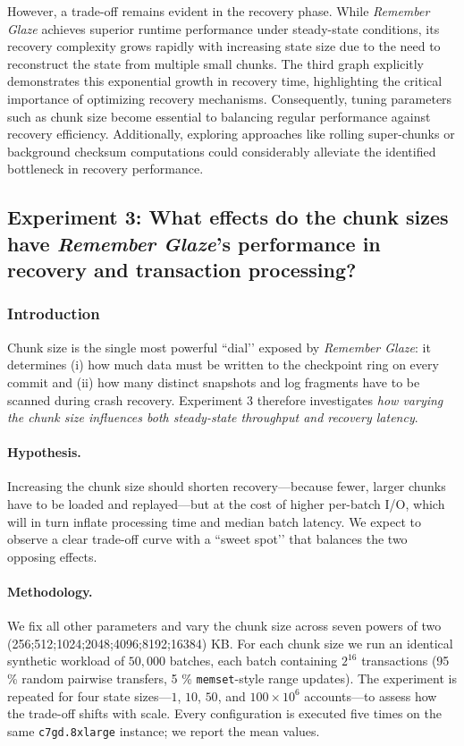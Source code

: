 \documentclass[conference]{IEEEtran}
\begin{document}
However, a trade-off remains evident in the recovery phase. While \textit{Remember Glaze} achieves superior runtime performance under steady-state conditions, its recovery complexity grows rapidly with increasing state size due to the need to reconstruct the state from multiple small chunks. The third graph explicitly demonstrates this exponential growth in recovery time, highlighting the critical importance of optimizing recovery mechanisms. Consequently, tuning parameters such as chunk size become essential to balancing regular performance against recovery efficiency. Additionally, exploring approaches like rolling super-chunks or background checksum computations could considerably alleviate the identified bottleneck in recovery performance.


\subsection{Experiment 3: What effects do the chunk sizes have \textit{Remember Glaze}'s performance in recovery and transaction processing?}
\subsubsection{Introduction}
Chunk size is the single most powerful “dial’’ exposed by \textit{Remember Glaze}:  
it determines (i) how much data must be written to the checkpoint ring on every
commit and (ii) how many distinct snapshots and log fragments have to be scanned
during crash recovery.  Experiment 3 therefore investigates \emph{how varying the
chunk size influences both steady-state throughput and recovery latency}.  

\paragraph{Hypothesis.}
Increasing the chunk size should shorten recovery—because fewer, larger chunks
have to be loaded and replayed—but at the cost of higher per-batch I/O, which
will in turn inflate processing time and median batch latency.  We expect to
observe a clear trade-off curve with a “sweet spot’’ that balances the two
opposing effects.

\paragraph{Methodology.}
We fix all other parameters and vary the chunk size across seven powers of two
(256;512;1024;2048;4096;8192;16384) KB.  For each chunk size we
run an identical synthetic workload of \(50{,}000\) batches, each batch
containing \(2^{16}\) transactions (95 \% random pairwise transfers, 5 \%
\texttt{memset}-style range updates).  The experiment is repeated for four state
sizes—\(1\), \(10\), \(50\), and \(100\times10^{6}\) accounts—to assess how the
trade-off shifts with scale.  Every configuration is executed five times on the
same \texttt{c7gd.8xlarge} instance; we report the mean values.
\end{document}
